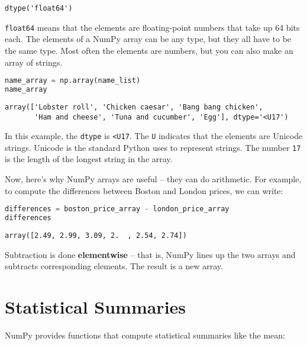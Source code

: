 \begin{lstlisting}[style=output]
dtype('float64')
\end{lstlisting}

\passthrough{\lstinline!float64!} means that the elements are
floating-point numbers that take up 64 bits each. The elements of a
NumPy array can be any type, but they all have to be the same type. Most
often the elements are numbers, but you can also make an array of
strings.

\begin{lstlisting}[language=Python,style=source]
name_array = np.array(name_list)
name_array
\end{lstlisting}

\begin{lstlisting}[style=output]
array(['Lobster roll', 'Chicken caesar', 'Bang bang chicken',
       'Ham and cheese', 'Tuna and cucumber', 'Egg'], dtype='<U17')
\end{lstlisting}

In this example, the \passthrough{\lstinline!dtype!} is
\passthrough{\lstinline!<U17!}. The \passthrough{\lstinline!U!}
indicates that the elements are Unicode strings. Unicode is the standard
Python uses to represent strings. The number
\passthrough{\lstinline!17!} is the length of the longest string in the
array.

Now, here's why NumPy arrays are useful -- they can do arithmetic. For
example, to compute the differences between Boston and London prices, we
can write:

\begin{lstlisting}[language=Python,style=source]
differences = boston_price_array - london_price_array
differences
\end{lstlisting}

\begin{lstlisting}[style=output]
array([2.49, 2.99, 3.09, 2.  , 2.54, 2.74])
\end{lstlisting}

Subtraction is done \textbf{elementwise} -- that is, NumPy lines up the
two arrays and subtracts corresponding elements. The result is a new
array.

\section{Statistical Summaries}\label{statistical-summaries}

NumPy provides functions that compute statistical summaries like the
mean:

